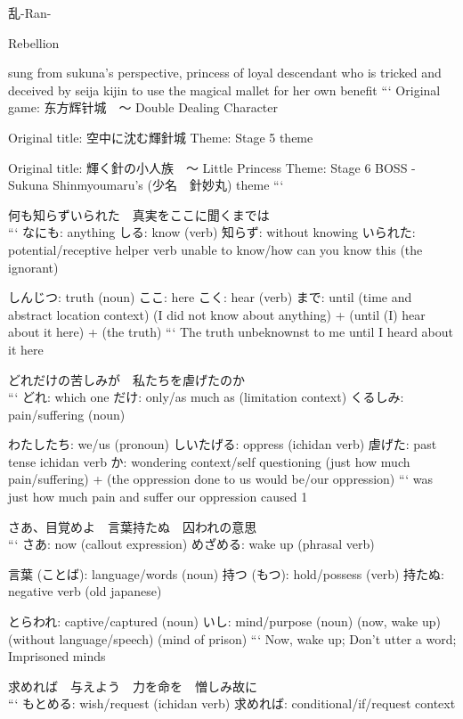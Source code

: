 乱-Ran-

Rebellion

sung from sukuna's perspective, princess of loyal descendant who is tricked and deceived by seija kijin to use the magical mallet for her own benefit
```
Original game: 东方辉针城　～ Double Dealing Character

Original title: 空中に沈む輝針城
Theme: Stage 5 theme

Original title: 輝く針の小人族　～ Little Princess
Theme: Stage 6 BOSS - Sukuna Shinmyoumaru's (少名　針妙丸) theme
```

何も知らずいられた　真実をここに聞くまでは \\
```
なにも: anything
しる: know (verb)
知らず:  without knowing
いられた: potential/receptive helper verb
unable to know/how can you know this (the ignorant)

                しんじつ: truth (noun)
                  ここ: here
                        こく: hear (verb)
                            まで: until (time and abstract location context)
(I did not know about anything) + (until (I) hear about it here) + (the truth)
```
The truth unbeknownst to me until I heard about it here

どれだけの苦しみが　私たちを虐げたのか \\
```
どれ: which one
だけ: only/as much as (limitation context)
          くるしみ: pain/suffering (noun)

                    わたしたち: we/us (pronoun)
                            しいたげる: oppress (ichidan verb)
                            虐げた: past tense ichidan verb
                              か: wondering context/self questioning
(just how much pain/suffering) + (the oppression done to us would be/our oppression)
```
was just how much pain and suffer our oppression caused {1}

さあ、目覚めよ　言葉持たぬ　囚われの意思 \\
```
さあ: now (callout expression)
めざめる: wake up (phrasal verb)

                言葉 (ことば): language/words (noun)
                持つ (もつ): hold/possess (verb)
                持たぬ: negative verb (old japanese)

                            とらわれ: captive/captured (noun)
                                    いし: mind/purpose (noun)
(now, wake up) (without language/speech) (mind of prison)
```
Now, wake up; Don't utter a word; Imprisoned minds

求めれば　与えよう　力を命を　憎しみ故に \\
```
もとめる: wish/request (ichidan verb)
求めれば: conditional/if/request context

